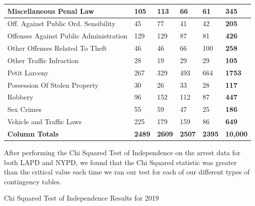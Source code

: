 \documentclass{article}
\begin{document}
\begin{center}
\begin{table}[h!]
\begin{tabular}{|l|l|l|l|l|l|}
Miscellaneous Penal Law                & 105           & 113            & 66              & 61            & \textbf{345}        \\ \hline
Off. Against Public Ord. Sensibility   & 45            & 77             & 41              & 42            & \textbf{205}        \\ \hline
Offenses Against Public Administration & 129           & 129            & 87              & 81            & \textbf{426}        \\ \hline
Other Offenses Related To Theft        & 46            & 46             & 66              & 100           & \textbf{258}        \\ \hline
Other Traffic Infraction               & 28            & 19             & 29              & 29            & \textbf{105}        \\ \hline
Petit Larceny                          & 267           & 329            & 493             & 664           & \textbf{1753}       \\ \hline
Possession Of Stolen Property          & 30            & 26             & 33              & 28            & \textbf{117}        \\ \hline
Robbery                                & 96            & 152            & 112             & 87            & \textbf{447}        \\ \hline
Sex Crimes                             & 55            & 59             & 47              & 25            & \textbf{186}        \\ \hline
Vehicle and Traffic Laws               & 225           & 179            & 159             & 86            & \textbf{649}        \\ \hline
\textbf{Column Totals}                 & \textbf{2489} & \textbf{2609}  & \textbf{2507}   & \textbf{2395} & \textbf{10,000}     \\ \hline
\end{tabular}
    \end{table}
\end{center}



After performing the Chi Squared Test of Independence on the arrest data for both LAPD and NYPD, we found that the Chi Squared statistic was greater than the critical value each time we ran our test for each of our different types of contingency tables. 

\begin{center}
    Chi Squared Test of Independence Results for 2019
\end{center}
\end{document}
